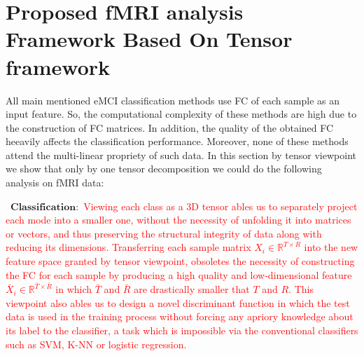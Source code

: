 \documentclass[preprint,12pt]{elsarticle}
\begin{document}
	
	
	
	\section{Proposed fMRI analysis Framework Based On Tensor framework}
All main mentioned eMCI classification methods use FC of each sample as an input feature. So, the computational complexity of these methods are high due to the construction of FC matrices. In addition, the quality of the obtained FC heeavily affects the  classification performance. Moreover, none of these methods  attend  the multi-linear propriety of such data.
In this section by tensor viewpoint we show that only by one tensor decomposition we could do the following analysis on fMRI data:

\textbullet\ $\mathbf{Classification:}$
\textcolor{red}{
	Viewing each class as a 3D tensor ables us to separately project each mode into a smaller one, without the necessity of unfolding it into matrices or vectors, and thus preserving the structural integrity of data along with reducing its dimensions. Transferring each sample matrix $X_i\in \mathbb{R}^{T \times R}$ into the new feature space granted by tensor viewpoint, obsoletes the necessity of constructing the FC for each sample by producing a high quality and low-dimensional feature $\bar{X}_i \in \mathbb{R}^{\bar{T} \times \bar{R}}$ in which $\bar{T}$ and $\bar{R}$ are drastically smaller that $T$ and $R$. This viewpoint also ables us to design a novel discriminant function in which the test data is used in the training process without forcing any apriory knowledge about its label to the classifier, a task which is impossible via the conventional classifiers such as SVM, K-NN or logistic regression.  
}



%	
\end{document}

